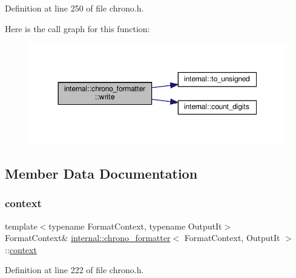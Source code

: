 Definition at line 250 of file chrono.\+h.

Here is the call graph for this function\+:
\nopagebreak
\begin{figure}[H]
\begin{center}
\leavevmode
\includegraphics[width=350pt]{structinternal_1_1chrono__formatter_a868a76a4e13f979b43fba28c249959b5_cgraph}
\end{center}
\end{figure}


\subsection{Member Data Documentation}
\mbox{\label{structinternal_1_1chrono__formatter_a4ef7274fcb1343272c95c0e8506fa255}} 
\subsubsection{\texorpdfstring{context}{context}}
{\footnotesize\ttfamily template$<$typename Format\+Context, typename Output\+It$>$ \\
Format\+Context\& \hyperlink{structinternal_1_1chrono__formatter}{internal\+::chrono\+\_\+formatter}$<$ Format\+Context, Output\+It $>$\+::\hyperlink{format_8h_af1dcf0d1d6738a06a6d7fd63e0bd1859}{context}}



Definition at line 222 of file chrono.\+h.

\mbox{\label{structinternal_1_1chrono__formatter_a4bb1878dfded9876eb133b8c19b0e28c}} 
